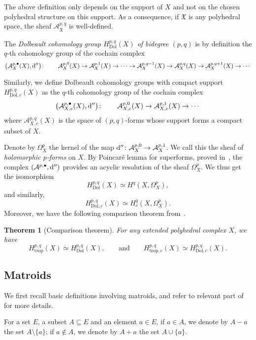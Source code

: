 \documentclass[11pt]{amsart}
\newtheorem{thm}{Theorem}[section]
\theoremstyle{definition}
\numberwithin{equation}{section}
\renewcommand{\~}{\widetilde}
\newcommand{\trop}{\mathrm{trop}} %
\renewcommand{\d}{{\rm d}} %
\newcommand{\X}{\mathfrak X}
\newcommand{\dis}{\d''}
\newcommand{\Dol}{\mathrm{Dol}}
\newcommand{\A}{\mathcal A} %
\begin{document}
\medskip

The above definition only depends on the support of $X$ and not on the chosen polyhedral structure on this support. As a consequence, if $\X$ is any polyhedral space, the sheaf $\A^{p,q}_\X$ is well-defined.

\medskip

The \emph{Dolbeault cohomology group $H^{p,q}_{\Dol}(X)$ of bidegree $(p,q)$} is by definition the $q$-th cohomology group of the cochain complex
\[\bigl(\A_X^{p,\bullet}(X), \dis\bigr)\colon \qquad \A_X^{p,0}(X) \to \A^{p,1}_X(X) \to \dots \to \A^{p,q-1}_X(X) \to \A^{p,q}_X(X) \to \A^{p,q+1}_X(X) \to \cdots \]

Similarly, we define Dolbeault cohomology groups with compact support $H^{p,q}_{\Dol,c}(X)$ as the $q$-th cohomology group of the cochain complex
\[\bigl(\A_{X,c}^{p,\bullet}(X), \dis\bigr)\colon \qquad \A_{X,c}^{p,0}(X) \to \A^{p,1}_{X,c}(X) \to \cdots \]
where $\A^{p,q}_{X, c}(X)$ is the space of $(p,q)$-forms whose support forms a compact subset of $X$.

Denote by $\Omega_X^p$ the kernel of the map $\dis\colon \A_X^{p,0} \to \A^{p,1}_X$. We call this the sheaf of \emph{holomorphic $p$-forms} on $X$.
By Poincar\'e lemma for superforms, proved in~\cites{Jell, JSS}, the complex $(\A^{p,\bullet}, \dis)$ provides an acyclic resolution of the sheaf $\Omega_X^p$. We thus get the isomorphism
\[H^{p,q}_\Dol(X) \simeq H^q(X, \Omega_X^p),\]
and similarly,
\[H^{p,q}_{\Dol, c}(X) \simeq H^q_c(X, \Omega_X^p).\]
Moreover, we have the following comparison theorem from~\cite{JSS}.
\begin{thm}[Comparison theorem]\label{thm:comparison}
For any extended polyhedral complex $X$, we have
\[H^{p,q}_\trop(X) \simeq H^{p,q}_\Dol(X) , \qquad \textrm{and} \qquad H^{p,q}_{\trop,c}(X) \simeq H^{p,q}_{\Dol,c}(X).\]
\end{thm}


\bigskip



\subsection{Matroids} \label{sec:matroid} We first recall basic definitions involving matroids, and refer to relevant part of \cite{Oxl11} for more details.

\medskip

For a set $E$, a subset $A \subseteq E$ and an element $a\in E$, if $a\in A$, we denote by $A-a$ the set $A \setminus \{a\}$; if $a\notin A$, we denote by $A+a$ the set $A \cup\{a\}$.
\end{document}
